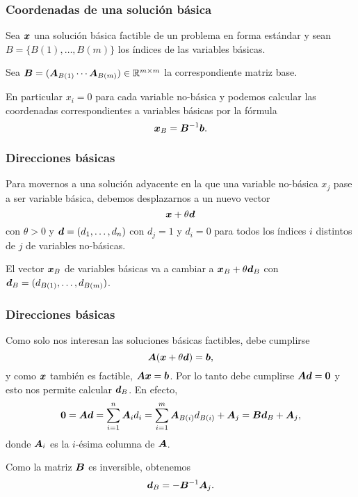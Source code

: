 \documentclass[aspectratio=169,12pt,spanish]{beamer}
\begin{document}
\begin{frame}
\frametitle{Coordenadas de una solución básica}


Sea $\bm{x}$ una solución básica factible de un problema en forma estándar y sean $B = \{B(1), \dots, B(m)\}$ los índices de las variables básicas. 

Sea $\bm{B} = (\bm{A}_{B(1)} \cdots \bm{A}_{B(m)}) \in \mathbb{R}^{m \times m}$ la correspondiente matriz base. 

En particular $x_i = 0$ para cada variable no-básica y  podemos calcular las coordenadas correspondientes a variables básicas por la fórmula
$$
\bm{x}_{B} = \bm{B}^{-1}\bm{b}.
$$


\end{frame}


\begin{frame}
\frametitle{Direcciones básicas}

Para movernos a una solución adyacente en la que una variable no-básica $x_j$ pase a ser variable básica, debemos desplazarnos a un nuevo vector $$\bm{x} + \theta \bm{d}$$ 
con $\theta > 0$ y $\bm{d} = (d_1, \dots, d_n)$ con $d_j =1$ y $d_i = 0$ para todos los índices $i$ distintos de $j$ de variables no-básicas. 

El vector $\bm{x}_B$ de variables básicas va a cambiar a $\bm{x}_B + \theta \bm{d}_B$ con $\bm{d}_B = (d_{B(1)}, \dots, d_{B(m)})$.


\end{frame}


\begin{frame}
\frametitle{Direcciones básicas}

Como solo nos interesan las soluciones básicas factibles, debe cumplirse
$$
\bm{A}(\bm{x} + \theta \bm{d}) = \bm{b},
$$
y como $\bm{x}$ también es factible, $\bm{A} \bm{x} = \bm{b}$. Por lo tanto debe cumplirse $\bm{A} \bm{d} = \bm{0}$ y esto nos permite calcular $\bm{d}_B$. En efecto,
$$
\bm{0} = \bm{A} \bm{d} = \sum_{i=1}^n \bm{A}_i d_i = \sum_{i=1}^m \bm{A}_{B(i)} d_{B(i)} + \bm{A}_j = \bm{B} \bm{d}_B + \bm{A}_j,$$
donde $\bm{A}_i$ es la $i$-ésima columna de $\bm{A}$.

Como la matriz $\bm{B}$ es inversible, obtenemos
$$
\bm{d}_B = -\bm{B}^{-1} \bm{A}_j.
$$

\end{frame}

\end{document}
